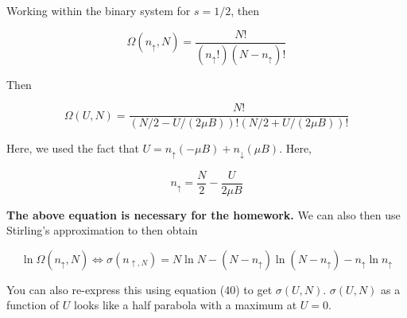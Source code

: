 \documentclass{article}
\newtheorem{one minute paper}[theorem]{One Minute Paper}
\begin{document}
Working within the binary system for $s = 1/2$, then 

\begin{equation}
    \Omega(n_{\uparrow}, N) = \frac{N!}{(n_{\uparrow}!)(N - n_{\uparrow})!}
\end{equation}

Then 

\begin{equation}
    \Omega(U, N) = \frac{N!}{(N/2 - U/(2 \mu B))!(N/2 + U/(2\mu B))!}
\end{equation}

Here, we used the fact that $U = n_{\uparrow}(-\mu B) + n_{\downarrow}(\mu B)$. Here, 

\begin{equation}
    n_{\uparrow} = \frac{N}{2} - \frac{U}{2\mu B}
\end{equation}

\textbf{The above equation is necessary for the homework.} We can also then use Stirling's approximation to then obtain 

\begin{equation}
    \ln \Omega(n_{\uparrow}, N) \iff \sigma (n_{\uparrow, N}) = N \ln N - (N - n_{\uparrow})\ln (N - n_{\uparrow}) - n_{\uparrow}\ln n_{\uparrow}
\end{equation}

You can also re-express this using equation (40) to get $\sigma(U,N)$. $\sigma(U,N)$ as a function of $U$ looks like a half parabola with a maximum at $U = 0$. 
\end{document}
